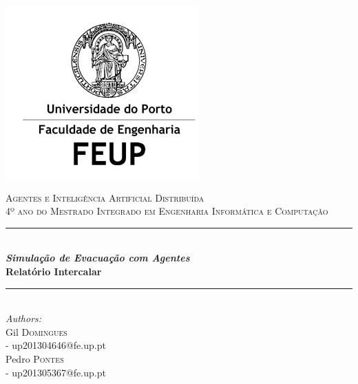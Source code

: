 \documentclass[12pt]{article}
\begin{document}
\begin{titlepage}

\newcommand{\HRule}{\rule{\linewidth}{1mm}} %

\center %
 

\includegraphics{feup.jpg}

\textsc{\large Agentes e Inteligência Artificial Distribuída}\\[0.8cm] %
\textsc{\large 4º ano do Mestrado Integrado em Engenharia Informática e Computação}\\[0.8cm] %


\HRule \\[1.2cm]
{ \huge \bfseries \textit{Simulação de Evacuação com Agentes}}\\[0.6cm] %
{ \large \bfseries Relatório Intercalar} \\[0.6cm]
\HRule \\[2cm]
 


\Large \emph{Authors:}\\[0.5cm] \normalsize
Gil \textsc{Domingues}\\[0.1cm]  
- up201304646@fe.up.pt\\[0.1cm]
Pedro \textsc{Pontes}\\[0.1cm]
- up201305367@fe.up.pt\\[2cm] 


\end{titlepage}
\end{document}
